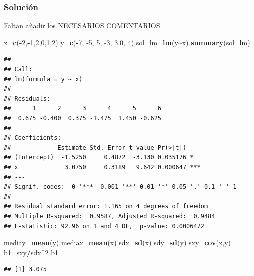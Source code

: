 \documentclass[
]{article}
\newenvironment{Shaded}{\begin{snugshade}}{\end{snugshade}}
\newcommand{\DecValTok}[1]{\textcolor[rgb]{0.00,0.00,0.81}{#1}}
\newcommand{\FloatTok}[1]{\textcolor[rgb]{0.00,0.00,0.81}{#1}}
\newcommand{\KeywordTok}[1]{\textcolor[rgb]{0.13,0.29,0.53}{\textbf{#1}}}
\newcommand{\NormalTok}[1]{#1}
\newcommand{\OperatorTok}[1]{\textcolor[rgb]{0.81,0.36,0.00}{\textbf{#1}}}
\begin{document}
\hypertarget{soluciuxf3n-10}{%
\subsubsection{Solución}\label{soluciuxf3n-10}}

Faltan añadir los NECESARIOS COMENTARIOS.

\begin{Shaded}
\begin{Highlighting}[]
\NormalTok{x=}\KeywordTok{c}\NormalTok{(}\OperatorTok{{-}}\DecValTok{2}\NormalTok{,}\OperatorTok{{-}}\DecValTok{1}\NormalTok{,}\DecValTok{2}\NormalTok{,}\DecValTok{0}\NormalTok{,}\DecValTok{1}\NormalTok{,}\DecValTok{2}\NormalTok{)}
\NormalTok{y=}\KeywordTok{c}\NormalTok{(}\OperatorTok{{-}}\DecValTok{7}\NormalTok{, }\DecValTok{{-}5}\NormalTok{,  }\DecValTok{5}\NormalTok{, }\DecValTok{{-}3}\NormalTok{,  }\FloatTok{3.0}\NormalTok{,  }\DecValTok{4}\NormalTok{)}
\NormalTok{sol\_lm=}\KeywordTok{lm}\NormalTok{(y}\OperatorTok{\textasciitilde{}}\NormalTok{x)}
\KeywordTok{summary}\NormalTok{(sol\_lm)}
\end{Highlighting}
\end{Shaded}

\begin{verbatim}
## 
## Call:
## lm(formula = y ~ x)
## 
## Residuals:
##      1      2      3      4      5      6 
##  0.675 -0.400  0.375 -1.475  1.450 -0.625 
## 
## Coefficients:
##             Estimate Std. Error t value Pr(>|t|)    
## (Intercept)  -1.5250     0.4872  -3.130 0.035176 *  
## x             3.0750     0.3189   9.642 0.000647 ***
## ---
## Signif. codes:  0 '***' 0.001 '**' 0.01 '*' 0.05 '.' 0.1 ' ' 1
## 
## Residual standard error: 1.165 on 4 degrees of freedom
## Multiple R-squared:  0.9587, Adjusted R-squared:  0.9484 
## F-statistic: 92.96 on 1 and 4 DF,  p-value: 0.0006472
\end{verbatim}

\begin{Shaded}
\begin{Highlighting}[]
\NormalTok{mediay=}\KeywordTok{mean}\NormalTok{(y)}
\NormalTok{mediax=}\KeywordTok{mean}\NormalTok{(x)}
\NormalTok{sdx=}\KeywordTok{sd}\NormalTok{(x)}
\NormalTok{sdy=}\KeywordTok{sd}\NormalTok{(y)}
\NormalTok{sxy=}\KeywordTok{cov}\NormalTok{(x,y)}
\NormalTok{b1=sxy}\OperatorTok{/}\NormalTok{sdx}\OperatorTok{\^{}}\DecValTok{2}
\NormalTok{b1}
\end{Highlighting}
\end{Shaded}

\begin{verbatim}
## [1] 3.075
\end{verbatim}
\end{document}
